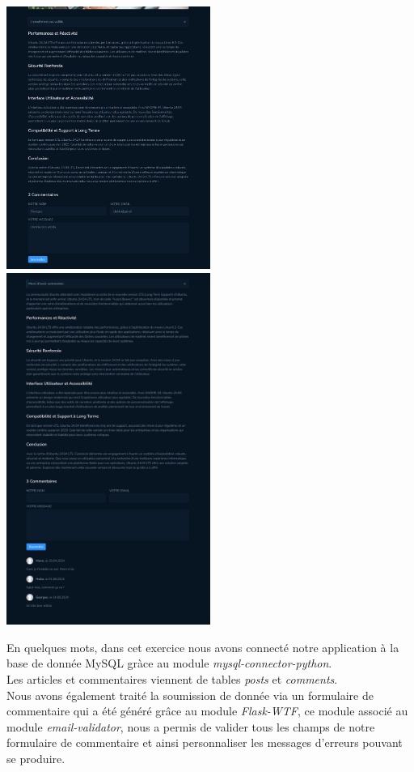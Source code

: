 \documentclass[a4paper,11pt]{article}
\begin{document}
                \includegraphics[width=0.5\textwidth]{CHAPITRE-5/5.1-A-RENDRE/screenshots/screen5.png}
                \includegraphics[width=0.5\textwidth]{CHAPITRE-5/5.1-A-RENDRE/screenshots/screen6.png}
            
                \begin{tcolorbox}[colback=lightgray!6, colframe=black, left=2mm, right=5mm, top=2mm, bottom=2mm, boxrule=0.1mm]
                    
                    En quelques mots, dans cet exercice nous avons connecté notre application à la base de donnée MySQL gràce au module \textit{mysql-connector-python}.\\
                    Les articles et commentaires viennent de tables \textit{posts} et \textit{comments}.\\
                    Nous avons également traité la soumission de donnée via un formulaire de commentaire qui a été généré grâce au module \textit{Flask-WTF}, ce module associé au module \textit{email-validator}, 
                    nous a permis de valider tous les champs de notre formulaire de commentaire et ainsi personnaliser les messages d'erreurs pouvant se produire.
                \end{tcolorbox}
\end{document}
